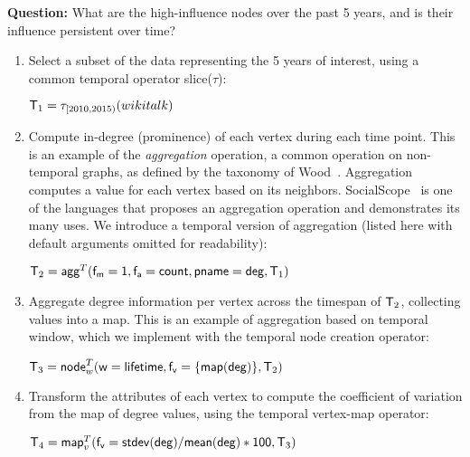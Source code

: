 {\bf Question:} What are the high-influence nodes over the past 5
years, and is their influence persistent over time?

\begin{enumerate}[noitemsep,itemindent=\dimexpr\labelwidth+\labelsep\relax,leftmargin=0pt]
\item Select a subset of the data representing the 5 years of
  interest, using a common temporal operator slice($\tau$):

\begin{center}
$\mathsf{T}_1 = \tau_{[2010,2015)}(wikitalk)$
\end{center}

\item Compute in-degree (prominence) of each vertex during each time
  point.  This is an example of the {\em aggregation} operation, a
  common operation on non-temporal graphs, as defined by the taxonomy
  of Wood~\cite{Wood2012}.  Aggregation computes a value for each
  vertex based on its neighbors.  SocialScope~\cite{Amer-Yahia2009} is
  one of the languages that proposes an aggregation operation and
  demonstrates its many uses.  We introduce a temporal version of
  aggregation (listed here with default arguments omitted for
  readability):

\begin{center}
$\mathsf{T}_2 = \textsf{agg}^T(\mathsf{f_m=1},\mathsf{f_a=count},\mathsf{pname=deg},\mathsf{T}_1)$
\end{center}

\item Aggregate degree information per vertex across the timespan
  of $\mathsf{T}_2$, collecting values into a map.  This is an example of
  aggregation based on temporal window, which we implement with the
  temporal node creation operator:

\begin{center}
$\mathsf{T}_3 =\textsf{node}^T_w(\mathsf{w=lifetime},\mathsf{f_v=\{map(deg)\}},\mathsf{T}_2)$
\end{center}

\item Transform the attributes of each vertex to compute the
  coefficient of variation from the map of degree values, using the
  temporal vertex-map operator:

\begin{center}
$\mathsf{T}_4 = \textsf{map}^T_v(\mathsf{f_v=stdev(deg)/mean(deg)*100}, \mathsf{T}_3)$
\end{center}

\end{enumerate}

